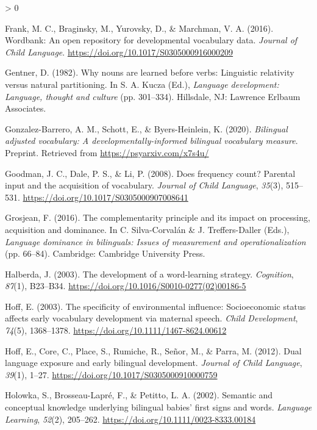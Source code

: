 \documentclass[
  english,
  ,man,floatsintext]{apa6}
\newlength{\cslhangindent}
\newenvironment{CSLReferences}[2] %
 {%
  \setlength{\parindent}{0pt}
  \ifodd #1 \everypar{\setlength{\hangindent}{\cslhangindent}}\ignorespaces\fi
  \ifnum #2 > 0
  \setlength{\parskip}{#2\baselineskip}
  \fi
 }%
 {}
\begin{document}
\begin{CSLReferences}{1}{0}
\leavevmode\hypertarget{ref-Frank_etal_2016}{}%
Frank, M. C., Braginsky, M., Yurovsky, D., \& Marchman, V. A. (2016). Wordbank: An open repository for developmental vocabulary data. \emph{Journal of Child Language}. \url{https://doi.org/10.1017/S0305000916000209}

\leavevmode\hypertarget{ref-Gentner_1982}{}%
Gentner, D. (1982). Why nouns are learned before verbs: Linguistic relativity versus natural partitioning. In S. A. Kucza (Ed.), \emph{Language development: Language, thought and culture} (pp. 301--334). Hillsdale, NJ: Lawrence Erlbaum Associates.

\leavevmode\hypertarget{ref-Gonzalez-Barrero_2020}{}%
Gonzalez-Barrero, A. M., Schott, E., \& Byers-Heinlein, K. (2020). \emph{Bilingual adjusted vocabulary: A developmentally-informed bilingual vocabulary measure}. Preprint. Retrieved from \url{https://psyarxiv.com/x7s4u/}

\leavevmode\hypertarget{ref-Goodman_etal_2008}{}%
Goodman, J. C., Dale, P. S., \& Li, P. (2008). Does frequency count? Parental input and the acquisition of vocabulary. \emph{Journal of Child Language}, \emph{35}(3), 515--531. \url{https://doi.org/10.1017/S0305000907008641}

\leavevmode\hypertarget{ref-Grosjean_2016}{}%
Grosjean, F. (2016). The complementarity principle and its impact on processing, acquisition and dominance. In C. Silva-Corvalán \& J. Treffers-Daller (Eds.), \emph{Language dominance in bilinguals: Issues of measurement and operationalization} (pp. 66--84). Cambridge: Cambridge University Press.

\leavevmode\hypertarget{ref-Halberda_2003}{}%
Halberda, J. (2003). The development of a word-learning strategy. \emph{Cognition}, \emph{87}(1), B23--B34. \url{https://doi.org/10.1016/S0010-0277(02)00186-5}

\leavevmode\hypertarget{ref-Hoff_2003}{}%
Hoff, E. (2003). The specificity of environmental influence: Socioeconomic status affects early vocabulary development via maternal speech. \emph{Child Development}, \emph{74}(5), 1368--1378. \url{https://doi.org/10.1111/1467-8624.00612}

\leavevmode\hypertarget{ref-Hoff_etal_2012}{}%
Hoff, E., Core, C., Place, S., Rumiche, R., Señor, M., \& Parra, M. (2012). Dual language exposure and early bilingual development. \emph{Journal of Child Language}, \emph{39}(1), 1--27. \url{https://doi.org/10.1017/S0305000910000759}

\leavevmode\hypertarget{ref-Holowka_etal_2002}{}%
Holowka, S., Brosseau-Lapré, F., \& Petitto, L. A. (2002). Semantic and conceptual knowledge underlying bilingual babies' first signs and words. \emph{Language Learning}, \emph{52}(2), 205--262. \url{https://doi.org/10.1111/0023-8333.00184}


\end{CSLReferences}
\end{document}
